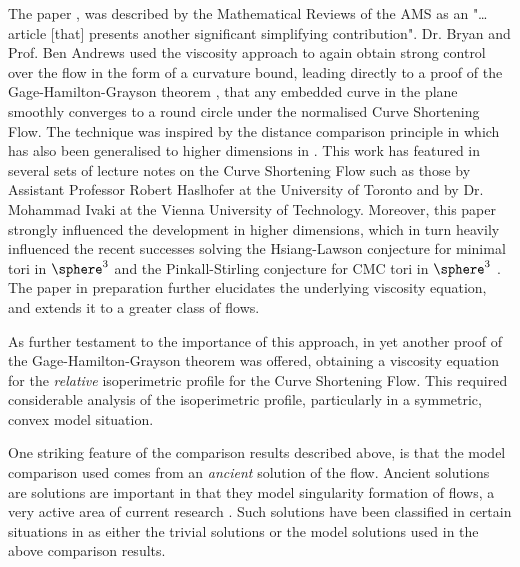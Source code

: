 \documentclass[12pt]{amsart}
\begin{document}
The paper \cite{MR2794630}, was described by the Mathematical Reviews of the AMS as an "\ldots{}article [that] presents another significant simplifying contribution". Dr. Bryan and Prof. Ben Andrews used the viscosity approach to again obtain strong control over the flow in the form of a curvature bound, leading directly to a proof of the Gage-Hamilton-Grayson theorem \cite{MR840401,MR906392}, that any embedded curve in the plane smoothly converges to a round circle under the normalised Curve Shortening Flow. The technique was inspired by the distance comparison principle in \cite{MR1656553} which has also been generalised to higher dimensions in \cite{MR2967056,MR3011290}. This work has featured in several sets of lecture notes on the Curve Shortening Flow such as those by Assistant Professor Robert Haslhofer at the University of Toronto and by Dr. Mohammad Ivaki at the Vienna University of Technology. Moreover, this paper strongly influenced the development in higher dimensions, which in turn heavily influenced the recent successes solving the Hsiang-Lawson conjecture \cite{MR3143888} for minimal tori in $\sphere^3$ and the Pinkall-Stirling conjecture for CMC tori in $\sphere^3$ \cite{2012arXiv1204.5007A}. The paper \cite{alpha_csf_dist_comp} in preparation further elucidates the underlying viscosity equation, and extends it to a greater class of flows.

As further testament to the importance of this approach, in \cite{MR2843240} yet another proof of the Gage-Hamilton-Grayson theorem was offered, obtaining a viscosity equation for the \emph{relative} isoperimetric profile for the Curve Shortening Flow. This required considerable analysis of the isoperimetric profile, particularly in a symmetric, convex model situation.

One striking feature of the comparison results described above, is that the model comparison used comes from an \emph{ancient} solution of the flow. Ancient solutions are solutions are important in that they model singularity formation of flows, a very active area of current research \cite{MR3020169,MR2993752}. Such solutions have been classified in certain situations in \cite{MR2669361, MR2971286} as either the trivial solutions or the model solutions used in the above comparison results.
\end{document}
